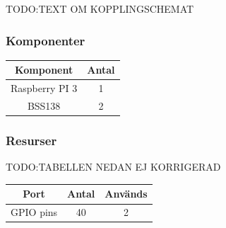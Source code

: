 \documentclass{article}
\begin{document}
TODO:TEXT OM KOPPLINGSCHEMAT

\subsubsection{Komponenter}

\begin{table}[H]
   \centering
  \begin{tabular}{ | c | c | }
    \hline
    \textbf{Komponent} & \textbf{Antal} \\
    \hline
    Raspberry PI 3 & 1 \\
    \hline
    BSS138 & 2 \\
    \hline
  \end{tabular}
\end{table}

\subsubsection{Resurser}

TODO:TABELLEN NEDAN EJ KORRIGERAD
\begin{table}[H]
   \centering
  \begin{tabular}{ | c | c | c | }
    \hline
    \textbf{Port} & \textbf{Antal} & \textbf{Används} \\
    \hline
    GPIO pins & 40 & 2 \\
    \hline
  \end{tabular}
\end{table}
\end{document}
